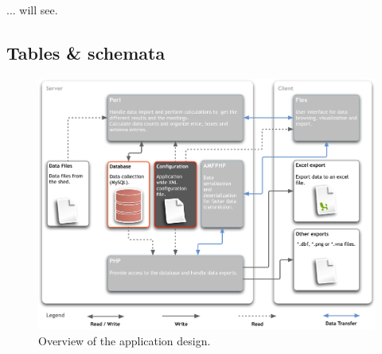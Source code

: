 \documentclass[a4paper,10pt,twoside,headings=small,bibliography=totocnumbered,headsepline]{scrartcl}
\begin{document}
... will see.

\newpage



\begin{appendix}
\addappheadtotoc


\newpage
\section{Tables \& schemata}
\label{sec:tables_schmemata}

\begin{figure}[htpb]
\begin{center}
  \includegraphics[width=\textwidth]{assets/pdf/application_design.pdf}
  \caption[Application design]{Overview of the application design.}
  \label{fig:app_design}
\end{center}
\end{figure}



\end{appendix}
\end{document}
